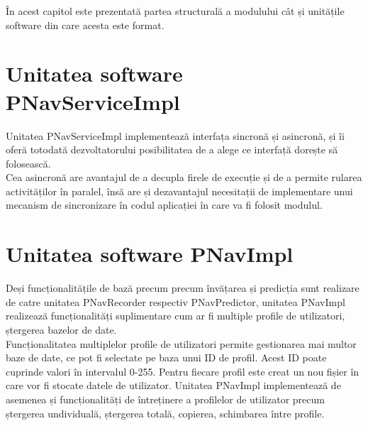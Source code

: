 \label{cap2}


\label{Chapter2} %

\thispagestyle{fancy}

În acest capitol este prezentată partea structurală a modulului cât și unitățile software din care acesta este format.

\section{Unitatea software PNavServiceImpl} 
Unitatea PNavServiceImpl implementează interfața sincronă și asincronă, și îi oferă totodată dezvoltatorului posibilitatea de a alege ce interfață dorește să folosească.
\vspace{6pt}
\\Cea asincronă are avantajul de a decupla firele de execuție și de a permite rularea activităților în paralel, însă are și dezavantajul necesitații de implementare unui mecanism de sincronizare în codul aplicației în care va fi folosit modulul.


\section{Unitatea software PNavImpl} 
Deși funcționalitățile de bază precum precum învățarea și predicția sunt realizare de catre unitatea PNavRecorder respectiv PNavPredictor, unitatea PNavImpl realizează funcționalități suplimentare cum ar fi multiple profile de utilizatori, ștergerea bazelor de date.
\vspace{6pt}
\\Funcționalitatea multiplelor profile de utilizatori permite gestionarea mai multor baze de date, ce pot fi selectate pe baza unui ID de profil.
Acest ID poate cuprinde valori în intervalul 0-255. Pentru fiecare profil este creat un nou fișier în care vor fi stocate datele de utilizator. Unitatea PNavImpl implementează de asemenea și funcționalități de întreținere a profilelor de utilizator precum ștergerea undividuală, ștergerea totală, copierea, schimbarea între profile.

